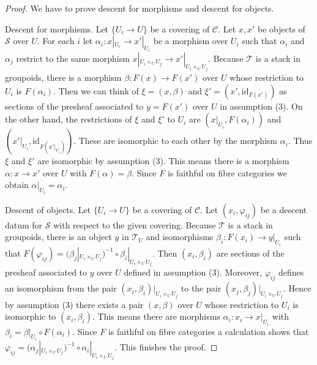 \begin{proof}
We have to prove descent for morphisms and descent for objects.

\medskip\noindent
Descent for morphisms. Let $\{U_i \to U\}$ be a covering of $\mathcal{C}$.
Let $x, x'$ be objects of $\mathcal{S}$ over $U$. For each $i$
let $\alpha_i : x|_{U_i} \to x'|_{U_i}$ be a morphism over $U_i$
such that $\alpha_i$ and $\alpha_j$ restrict to the same morphism
$x|_{U_i \times_U U_j} \to x'|_{U_i \times_U U_j}$.
Because $\mathcal{T}$ is a stack in groupoids, there is a morphism
$\beta : F(x) \to F(x')$ over $U$ whose restriction to $U_i$ is $F(\alpha_i)$.
Then we can think of $\xi = (x, \beta)$ and $\xi' = (x', \text{id}_{F(x')})$
as sections of the presheaf associated to $y = F(x')$ over $U$
in assumption (3). On the other hand, the restrictions of
$\xi$ and $\xi'$ to $U_i$ are $(x|_{U_i}, F(\alpha_i))$
and $(x'|_{U_i}, \text{id}_{F(x'|_{U_i})})$.
These are isomorphic to each other by the morphism $\alpha_i$.
Thus $\xi$ and $\xi'$ are isomorphic by assumption (3). This means there is a
morphism $\alpha : x \to x'$ over $U$ with $F(\alpha) = \beta$.
Since $F$ is faithful on fibre categories we obtain
$\alpha|_{U_i} = \alpha_i$.

\medskip\noindent
Descent of objects. Let $\{U_i \to U\}$ be a covering of $\mathcal{C}$.
Let $(x_i, \varphi_{ij})$ be a descent datum for $\mathcal{S}$ with
respect to the given covering. Because $\mathcal{T}$ is a stack in groupoids,
there is an object $y$ in $\mathcal{T}_U$ and isomorphisms
$\beta_i : F(x_i) \to y|_{U_i}$ such that
$F(\varphi_{ij}) = (\beta_j|_{U_i \times_U U_j})^{-1} \circ
\beta_i|_{U_i \times_U U_j}$.
Then $(x_i, \beta_i)$ are sections of the presheaf associated to
$y$ over $U$ defined in assumption (3).
Moreover, $\varphi_{ij}$ defines an isomorphism
from the pair $(x_i, \beta_i)|_{U_i \times_U U_j}$ to 
the pair $(x_j, \beta_j)|_{U_i \times_U U_j}$.
Hence by assumption (3) there exists a pair $(x, \beta)$ over $U$
whose restriction to $U_i$ is isomorphic to $(x_i, \beta_i)$.
This means there are morphisms $\alpha_i : x_i \to x|_{U_i}$
with $\beta_i = \beta|_{U_i} \circ F(\alpha_i)$.
Since $F$ is faithful on fibre categories a calculation shows
that $\varphi_{ij} = (\alpha_j|_{U_i \times_U U_j})^{-1} \circ
\alpha_i|_{U_i \times_U U_j}$. This finishes the proof.
\end{proof}










